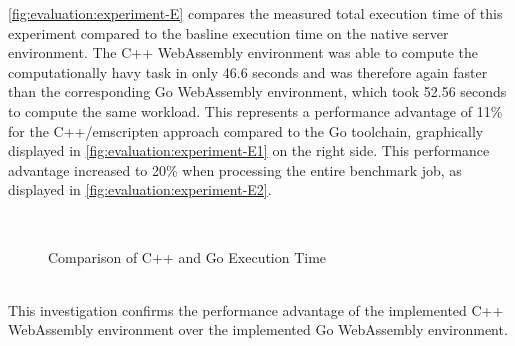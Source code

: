 \autoref{fig:evaluation:experiment-E} compares the measured total execution time of this experiment compared to the basline execution time on the native server environment. The C++ WebAssembly environment was able to compute the computationally havy task in only 46.6 seconds and was therefore again faster than the corresponding Go WebAssembly environment, which took 52.56 seconds to compute the same workload. This represents a performance advantage of 11\% for the C++/emscripten approach compared to the Go toolchain, graphically displayed in \autoref{fig:evaluation:experiment-E1} on the right side. This performance advantage increased to 20\% when processing the entire benchmark job, as displayed in \autoref{fig:evaluation:experiment-E2}.
\begin{figure}[htbp]
    \myfloatalign
     \\
    \caption{Comparison of C++ and Go Execution Time}
    \label{fig:evaluation:experiment-E}
\end{figure}
~\\
This investigation confirms the performance advantage of the implemented C++ WebAssembly environment over the implemented Go WebAssembly environment.